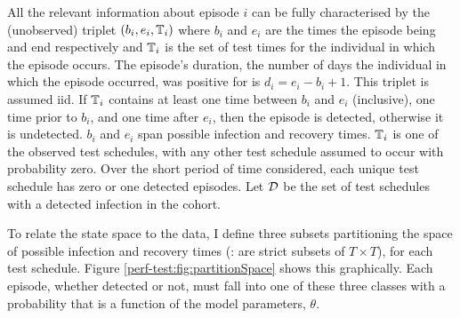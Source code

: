 \documentclass[thesis.tex]{subfiles}
\begin{document}
All the relevant information about episode $i$ can be fully characterised by the (unobserved) triplet $(b_i, e_i, \mathbb{T}_i)$ where $b_i$ and $e_i$ are the times the episode being and end respectively and $\mathbb{T}_i$ is the set of test times for the individual in which the episode occurs.
The episode's duration, the number of days the individual in which the episode occurred, was positive for is $d_i = e_i - b_i + 1$.
This triplet is assumed iid.
If $\mathbb{T}_i$ contains at least one time between $b_i$ and $e_i$ (inclusive), one time prior to $b_i$, and one time after $e_i$, then the episode is detected, otherwise it is undetected.
$b_i$ and $e_i$ span possible infection and recovery times.
$\mathbb{T}_i$ is one of the observed test schedules, with any other test schedule assumed to occur with probability zero.
Over the short period of time considered, each unique test schedule has zero or one detected episodes.
Let $\mathcal{D}$ be the set of test schedules with a detected infection in the cohort.

To relate the state space to the data, I define three subsets partitioning the space of possible infection and recovery times (\ie: are strict subsets of $T \times T$), for each test schedule.
Figure \ref{perf-test:fig:partitionSpace} shows this graphically.
Each episode, whether detected or not, must fall into one of these three classes with a probability that is a function of the model parameters, $\theta$.
\end{document}
